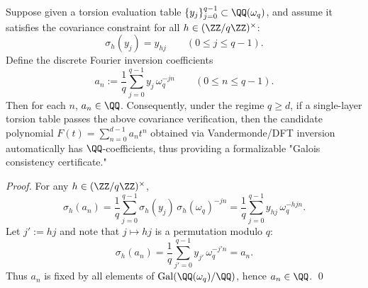 \begin{corollary}[Conjugate closure verification \texorpdfstring{$\Rightarrow$}{=>} rational coefficient certificate]\label{cor:finite-part-torsion-table-galois-certificate}
Suppose given a torsion evaluation table \(\{y_j\}_{j=0}^{q-1}\subset\QQ(\omega_q)\), and assume it satisfies the covariance constraint for all \(h\in(\ZZ/q\ZZ)^\times\):
\[
\sigma_h(y_j)=y_{hj}\qquad(0\le j\le q-1).
\]
Define the discrete Fourier inversion coefficients
\[
a_n:=\frac{1}{q}\sum_{j=0}^{q-1}y_j\,\omega_q^{-jn}\qquad(0\le n\le q-1).
\]
Then for each \(n\), \(a_n\in\QQ\).
Consequently, under the regime \(q\ge d\), if a single-layer torsion table passes the above covariance verification, then the candidate polynomial \(F(t)=\sum_{n=0}^{d-1}a_n t^n\) obtained via Vandermonde/DFT inversion automatically has \(\QQ\)-coefficients, thus providing a formalizable "Galois consistency certificate."
\end{corollary}
\begin{proof}
For any \(h\in(\ZZ/q\ZZ)^\times\),
\[
\sigma_h(a_n)
=\frac{1}{q}\sum_{j=0}^{q-1}\sigma_h(y_j)\,\sigma_h(\omega_q)^{-jn}
=\frac{1}{q}\sum_{j=0}^{q-1}y_{hj}\,\omega_q^{-hjn}.
\]
Let \(j':=hj\) and note that \(j\mapsto hj\) is a permutation modulo \(q\):
\[
\sigma_h(a_n)=\frac{1}{q}\sum_{j'=0}^{q-1}y_{j'}\,\omega_q^{-j'n}=a_n.
\]
Thus \(a_n\) is fixed by all elements of \(\mathrm{Gal}(\QQ(\omega_q)/\QQ)\), hence \(a_n\in\QQ\). \qed
\end{proof}
